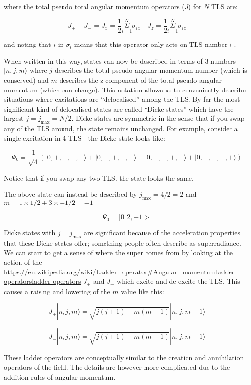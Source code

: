 \documentclass[
]{article}
\let\oldhref\href
\renewcommand{\href}[2]{\ifx#1\urlprefix\oldhref{#1}{#2}\else\uline{\oldhref{#1}{#2}}\fi}
\renewcommand{\[}{\begin{equation}}
\renewcommand{\]}{\end{equation}}
\begin{document}
where the total pseudo total angular momentum operators (\(J\)) for
\(N\) TLS are:

\[
J_{+} + J_{-} = J_{x} = \frac{1}{2}\overset{N}{\underset{i=1}{\Sigma}} \sigma_{i x} \,\,\,\,\,\, J_{z} = \frac{1}{2}\overset{N}{\underset{i=1}{\Sigma}} \sigma_{i z}
\]

and noting that \(i\) in \(\sigma_i\) means that this operator only acts
on TLS number \(i\) .

When written in this way, states can now be described in terms of 3
numbers \(|n, j, m\rangle\) where \(j\) describes the total pseudo
angular momentum number (which is conserved) and \(m\) describes the z
component of the total pseudo angular momentum (which can change). This
notation allows us to conveniently describe situations where excitations
are ``delocalised'' among the TLS. By far the most significant kind of
delocalised states are called ``Dicke states'' which have the largest
\(j=j_{\max} = N/2\). Dicke states are symmetric in the sense that if
you swap any of the TLS around, the state remains unchanged. For
example, consider a single excitation in 4 TLS - the Dicke state looks
like:

\[
\Psi_0 = \frac{1}{\sqrt{4}}\left(| 0, +, -, -, - \rangle + | 0, -, +, -, - \rangle + | 0, -, -, +, - \rangle + | 0, -, -, -, + \rangle \right)
\]

Notice that if you swap any two TLS, the state looks the same.

The above state can instead be described by \(j_{\max}= 4/2  = 2\) and
\(m = 1\times 1/2 + 3\times -1/2 =-1\)

\[
\Psi_0 = |0,2,-1>
\]

Dicke states with \(j=j_{\max}\) are significant because of the
acceleration properties that these Dicke states offer; something people
often describe as superradiance. We can start to get a sense of where
the super comes from by looking at the action of the
\href{https://en.wikipedia.org/wiki/Ladder_operator\#Angular_momentum}{ladder
operators} \(J_{+}\) and \(J_{-}\) which excite and de-excite the TLS.
This causes a raising and lowering of the \(m\) value like this:

\[
J_+ |n, j, m\rangle  =  \sqrt{j(j + 1) - m(m + 1)} |n, j, m + 1\rangle
\]

\[
J_- |n, j, m\rangle =  \sqrt{j(j + 1) - m(m - 1)} |n, j, m - 1\rangle
\]

These ladder operators are conceptually similar to the creation and
annihilation operators of the field. The details are however more
complicated due to the addition rules of angular momentum.
\end{document}
